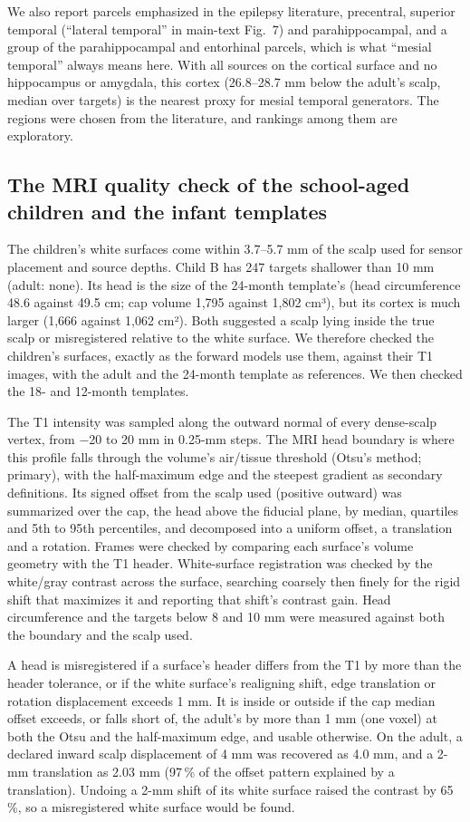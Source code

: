 \documentclass[preprint,12pt,authoryear,a4paper]{elsarticle}
\begin{document}
We also report parcels emphasized in the epilepsy literature, precentral, superior temporal (``lateral temporal'' in main-text Fig.~7) and parahippocampal, and a group of the parahippocampal and entorhinal parcels, which is what ``mesial temporal'' always means here. With all sources on the cortical surface and no hippocampus or amygdala, this cortex (26.8–28.7 mm below the adult's scalp, median over targets) is the nearest proxy for mesial temporal generators. The regions were chosen from the literature, and rankings among them are exploratory.

\subsection{The MRI quality check of the school-aged children and the infant templates}\label{sec:S4.3}

The children's white surfaces come within 3.7–5.7 mm of the scalp used for sensor placement and source depths. Child B has 247 targets shallower than 10 mm (adult: none). Its head is the size of the 24-month template's (head circumference 48.6 against 49.5 cm; cap volume 1,795 against 1,802 cm³), but its cortex is much larger (1,666 against 1,062 cm²). Both suggested a scalp lying inside the true scalp or misregistered relative to the white surface. We therefore checked the children's surfaces, exactly as the forward models use them, against their T1 images, with the adult and the 24-month template as references. We then checked the 18- and 12-month templates.

The T1 intensity was sampled along the outward normal of every dense-scalp vertex, from −20 to 20 mm in 0.25-mm steps. The MRI head boundary is where this profile falls through the volume's air/tissue threshold (Otsu's method; primary), with the half-maximum edge and the steepest gradient as secondary definitions. Its signed offset from the scalp used (positive outward) was summarized over the cap, the head above the fiducial plane, by median, quartiles and 5th to 95th percentiles, and decomposed into a uniform offset, a translation and a rotation. Frames were checked by comparing each surface's volume geometry with the T1 header. White-surface registration was checked by the white/gray contrast across the surface, searching coarsely then finely for the rigid shift that maximizes it and reporting that shift's contrast gain. Head circumference and the targets below 8 and 10 mm were measured against both the boundary and the scalp used.

A head is misregistered if a surface's header differs from the T1 by more than the header tolerance, or if the white surface's realigning shift, edge translation or rotation displacement exceeds 1 mm. It is inside or outside if the cap median offset exceeds, or falls short of, the adult's by more than 1 mm (one voxel) at both the Otsu and the half-maximum edge, and usable otherwise. On the adult, a declared inward scalp displacement of 4 mm was recovered as 4.0 mm, and a 2-mm translation as 2.03 mm (97\,\% of the offset pattern explained by a translation). Undoing a 2-mm shift of its white surface raised the contrast by 65\,\%, so a misregistered white surface would be found.
\end{document}
